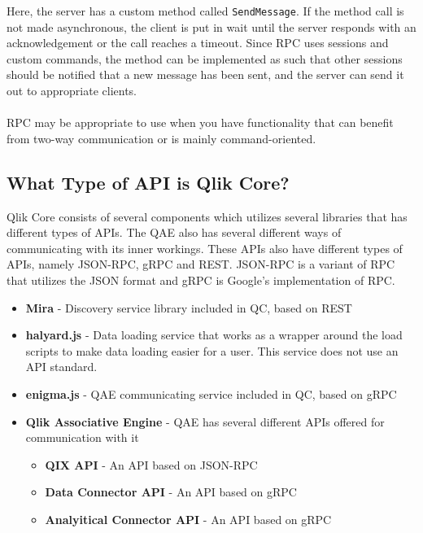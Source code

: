 \documentclass{cslthse-msc}
\begin{document}
    Here, the server has a custom method called \texttt{SendMessage}. If the
    method call is not made asynchronous, the client is put in wait until
    the server responds with an acknowledgement or the call reaches a
    timeout. Since RPC uses sessions and custom commands, the method can be
    implemented as such that other sessions should be notified that a new
    message has been sent, and the server can send it out to appropriate
    clients.
    \\ \\
    RPC may be appropriate to use when you have functionality that can
    benefit from two-way communication or is mainly command-oriented.

    \subsection{What Type of API is Qlik Core?}

    Qlik Core consists of several components which utilizes several libraries that has different types
    of APIs. The QAE also has several different ways of communicating with its inner workings. These APIs also have different types of APIs, namely JSON-RPC, gRPC and REST. JSON-RPC is a variant of RPC that utilizes the JSON format and gRPC is Google's implementation of RPC\citep{qlikwebsite}.
    \begin{itemize}[label={}]
        \item \textbf{Mira} - Discovery service library included in QC, based on REST
        \item \textbf{halyard.js} - Data loading service that works as a wrapper around the load scripts to make data loading easier for a user. This service does not use an API standard.
        \item \textbf{enigma.js} - QAE communicating service included in QC, based on gRPC
        \item \textbf{Qlik Associative Engine} - QAE has several different APIs offered for communication with it
        \begin{itemize}[label={}]
            \item \textbf{QIX API} - An API based on JSON-RPC
            \item \textbf{Data Connector API} - An API based on gRPC
            \item \textbf{Analyitical Connector API} - An API based on gRPC
        \end{itemize}
    \end{itemize}
\end{document}
